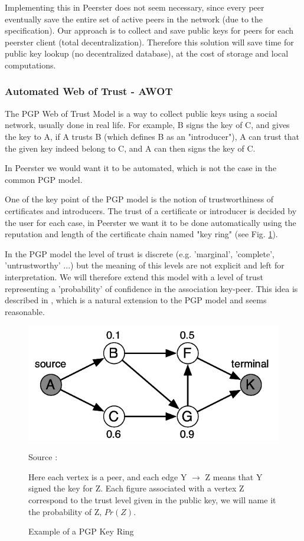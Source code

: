 \documentclass[]{article}
\begin{document}
Implementing this in Peerster does not seem necessary, since every peer eventually save the entire set of active peers in the network (due to the specification). Our approach is to collect and save public keys for peers for each peerster client (total decentralization). Therefore this solution will save time for public key lookup (no decentralized database), at the cost of storage and local computations.

\subsubsection{Automated Web of Trust - AWOT}
\label{sec:related-work-wot}

The PGP Web of Trust Model \cite{abdul1997pgp} is a way to collect public keys using a social network, usually done in real life. For example, B signs the key of C, and gives the key to A, if A trusts B (which defines B as an "introducer"), A can trust that the given key indeed belong to C, and A can then signs the key of C. 

In Peerster we would want it to be automated, which is not the case in the common PGP model. 

One of the key point of the PGP model is the notion of trustworthiness of certificates and introducers. The trust of a certificate or introducer is decided by the user for each case, in Peerster we want it to be done automatically using the reputation and length of the certificate chain named "key ring" (see Fig. \ref{fig:pgp-key-ring}).

In the PGP model the level of trust is discrete (e.g. 'marginal', 'complete', 'untrustworthy' ...) but the meaning of this levels are not explicit and left for interpretation. We will therefore extend this model with a level of trust representing a 'probability' of confidence in the association key-peer. This idea is described in \cite{haenni2007new}, which is a natural extension to the PGP model and seems reasonable.

\begin{figure}[h]
\includegraphics{pgp-key-ring}
\centering
\caption{Example of a PGP Key Ring}
\label{fig:pgp-key-ring}
Source : \cite{haenni2007new}

Here each vertex is a peer, and each edge Y $\rightarrow$ Z means that Y signed the key for Z.
Each figure associated with a vertex Z  correspond to the trust level given in the public key, we will name it the probability of Z, $Pr(Z)$.
\end{figure}
\end{document}
